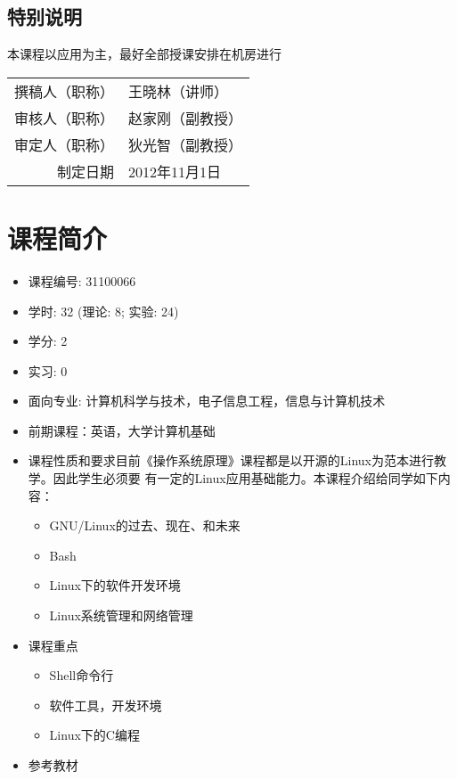 \documentclass{wx672article}
\makeatletter
\newcommand{\Sign}{\begin{flushright}%
  \begin{tabular}{r@{：\,}l}%
    撰稿人（职称）&王晓林（讲师）\\%
    审核人（职称）&赵家刚（副教授）\\%
    审定人（职称）&狄光智（副教授）\\%
    制定日期&2012年11月1日%
  \end{tabular}%
\end{flushright}}
\makeatother
\begin{document}
\nocite{cooper10bash,web:debianhandbook}
\printbibliography[heading=none]{}


\subsection{特别说明}
本课程以应用为主，最好全部授课安排在机房进行

\Sign{}

\section{课程简介}

\begin{itemize}
\item 课程编号: 31100066
\item 学时: 32 (理论: 8; 实验: 24)
\item 学分: 2
\item 实习: 0
\item 面向专业: 计算机科学与技术，电子信息工程，信息与计算机技术
\item 前期课程：英语，大学计算机基础
\item 课程性质和要求目前《操作系统原理》课程都是以开源的Linux为范本进行教学。因此学生必须要
  有一定的Linux应用基础能力。本课程介绍给同学如下内容：
  \begin{itemize}
  \item GNU/Linux的过去、现在、和未来
  \item Bash
  \item Linux下的软件开发环境
  \item Linux系统管理和网络管理
  \end{itemize}
\item 课程重点
  \begin{itemize}
  \item Shell命令行
  \item 软件工具，开发环境
  \item Linux下的C编程
  \end{itemize}
\item 参考教材\hfill \nocite{cooper10bash,web:debianhandbook}
  \printbibliography[heading=none]{}
\end{itemize}
\end{document}

